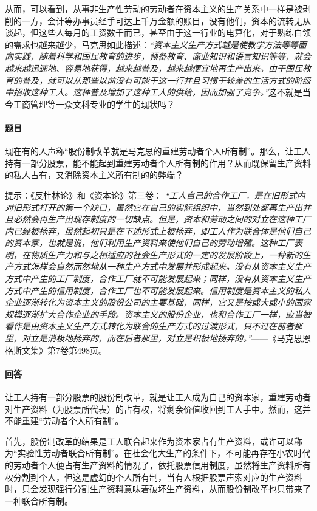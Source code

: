 \documentclass[a4paper]{article}
\begin{document}
从而，可以看到，从事非生产性劳动的劳动者在资本主义的生产关系中一样是被剥削的一方，会计等办事员经手可达上千万金额的账目，没有他们，资本的流转无从谈起，但这些人每月的工资数千而已，甚至由于这一行业的电算化，对于熟练白领的需求也越来越少，马克思如此描述：\emph{“资本主义生产方式越是使教学方法等等面向实践，随着科学和国民教育的进步，预备教育、商业知识和语言知识等等，就会越来越迅速地、容易地获得，越来越普及，越来越便宜地再生产出来。由于国民教育的普及，就可以从那些以前没有可能干这一行并且习惯于较差的生活方式的阶级中招收这种工人。这种普及增加了这种工人的供给，因而加强了竞争。”}这不就是当今工商管理等一众文科专业的学生的现状吗？

\paragraph{题目}
现在有的人声称“股份制改革就是马克思的重建劳动者个人所有制”。那么，让工人持有一部分股票，能不能起到重建劳动者个人所有制的作用？从而既保留生产资料的私人占有，又消除资本主义所有制的的弊端？

提示：《反杜林论》和《资本论》第三卷：
\emph{“工人自己的合作工厂，是在旧形式内对旧形式打开的第一个缺口，虽然它在自己的实际组织中，当然到处都再生产出并且必然会再生产出现存制度的一切缺点。但是，资本和劳动之间的对立在这种工厂内已经被扬弃，虽然起初只是在下述形式上被扬弃，即工人作为联合体是他们自己的资本家，也就是说，他们利用生产资料来使他们自己的劳动增殖。这种工厂表明，在物质生产力和与之相适应的社会生产形式的一定的发展阶段上，一种新的生产方式怎样会自然而然地从一种生产方式中发展并形成起来。没有从资本主义生产方式中产生的工厂制度，合作工厂就不可能发展起来；同样，没有从资本主义生产方式中产生的信用制度，合作工厂也不可能发展起来。信用制度是资本主义的私人企业逐渐转化为资本主义的股份公司的主要基础，同样，它又是按或大或小的国家规模逐渐扩大合作企业的手段。资本主义的股份企业，也和合作工厂一样，应当被看作是由资本主义生产方式转化为联合的生产方式的过渡形式，只不过在前者那里，对立是消极地扬弃的，而在后者那里，对立是积极地扬弃的。”}——《马克思恩格斯文集》第7卷第498页。

\paragraph{回答}
让工人持有一部分股票的股份制改革，就是让工人成为自己的资本家，重建劳动者对生产资料（为股票所代表）的占有权，将剩余价值收回到工人手中。然而，这并不能重建“劳动者个人所有制”。

首先，股份制改革的结果是工人联合起来作为资本家占有生产资料，或许可以称为“实验性劳动者联合所有制”。在社会化大生产的条件下，不可能再存在小农时代的劳动者个人便占有生产资料的情况了，依托股票信用制度，虽然将生产资料所有权分割到个人，但这是虚幻的个人所有制，当有人根据股票声索对应的生产资料时，只会发现强行分割生产资料意味着破坏生产资料，从而股份制改革也只带来了一种联合所有制。
\end{document}
